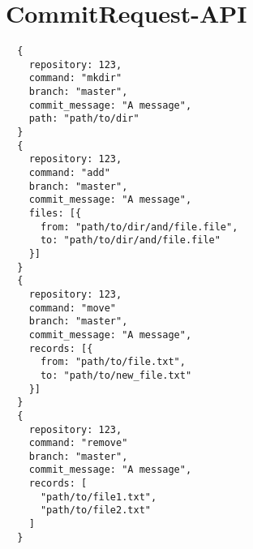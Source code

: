 \chapter{CommitRequest-API}
\begin{verbatim}
  {
    repository: 123,
    command: "mkdir"
    branch: "master",
    commit_message: "A message",
    path: "path/to/dir"
  }
  {
    repository: 123,
    command: "add"
    branch: "master",
    commit_message: "A message",
    files: [{
      from: "path/to/dir/and/file.file",
      to: "path/to/dir/and/file.file"
    }]
  }
  {
    repository: 123,
    command: "move"
    branch: "master",
    commit_message: "A message",
    records: [{
      from: "path/to/file.txt",
      to: "path/to/new_file.txt"
    }]
  }
  {
    repository: 123,
    command: "remove"
    branch: "master",
    commit_message: "A message",
    records: [
      "path/to/file1.txt", 
      "path/to/file2.txt"
    ]
  }
\end{verbatim}